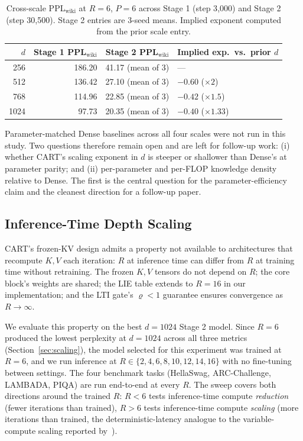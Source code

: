 \documentclass{article}
\newcommand{\cart}{\textsc{CART}}
\newcommand{\pplwiki}{PPL$_\text{wiki}$}
\begin{document}
\begin{table}[htbp]
\centering
\caption{Cross-scale \pplwiki{} at $R{=}6$, $P{=}6$ across Stage 1 (step 3{,}000) and Stage 2 (step 30{,}500). Stage 2 entries are 3-seed means. Implied exponent computed from the prior scale entry.}
\label{tab:scaling}
\footnotesize
\begin{tabular}{rrrl}
\toprule
$d$ & Stage 1 \pplwiki & Stage 2 \pplwiki & Implied exp.\ vs.\ prior $d$ \\
\midrule
 256 & 186.20 & 41.17 (mean of 3) & ---                   \\
 512 & 136.42 & 27.10 (mean of 3) & $-0.60$ ($\times 2$)   \\
 768 & 114.96 & 22.85 (mean of 3) & $-0.42$ ($\times 1.5$) \\
1024 &  97.73 & 20.35 (mean of 3) & $-0.40$ ($\times 1.33$) \\
\bottomrule
\end{tabular}
\end{table}

Parameter-matched Dense baselines across all four scales were not run in this study. Two questions therefore remain open and are left for follow-up work: (i) whether \cart{}'s scaling exponent in $d$ is steeper or shallower than Dense's at parameter parity; and (ii) per-parameter and per-FLOP knowledge density relative to Dense. The first is the central question for the parameter-efficiency claim and the cleanest direction for a follow-up paper.

\subsection{Inference-Time Depth Scaling}
\label{sec:inference_R}

\cart{}'s frozen-KV design admits a property not available to architectures that recompute $K, V$ each iteration: $R$ at inference time can differ from $R$ at training time without retraining. The frozen $K, V$ tensors do not depend on $R$; the core block's weights are shared; the LIE table extends to $R{=}16$ in our implementation; and the LTI gate's $\varrho < 1$ guarantee ensures convergence as $R \to \infty$.

We evaluate this property on the best $d{=}1024$ Stage 2 model. Since $R{=}6$ produced the lowest perplexity at $d{=}1024$ across all three metrics (Section~\ref{sec:scaling}), the model selected for this experiment was trained at $R{=}6$, and we run inference at $R \in \{2, 4, 6, 8, 10, 12, 14, 16\}$ with no fine-tuning between settings. The four benchmark tasks (HellaSwag, ARC-Challenge, LAMBADA, PIQA) are run end-to-end at every $R$. The sweep covers both directions around the trained $R$: $R < 6$ tests inference-time compute \emph{reduction} (fewer iterations than trained), $R > 6$ tests inference-time compute \emph{scaling} (more iterations than trained, the deterministic-latency analogue to the variable-compute scaling reported by~\citet{geiping2025latent}).
\end{document}
